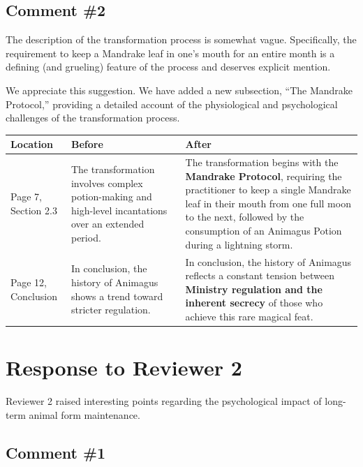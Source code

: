 \documentclass[
  letterpaper,
  DIV=11,
  numbers=noendperiod]{scrartcl}
\begin{document}
\subsection{Comment \#2}\label{comment-2}

\begin{reviewerbox}

The description of the transformation process is somewhat vague. Specifically, the requirement to keep a Mandrake leaf in one's mouth for an entire month is a defining (and grueling) feature of the process and deserves explicit mention.

\end{reviewerbox}

We appreciate this suggestion. We have added a new subsection, ``The Mandrake Protocol,'' providing a detailed account of the physiological and psychological challenges of the transformation process.

\begin{longtable*}{p{0.18\textwidth} p{0.36\textwidth} p{0.36\textwidth}}
\toprule
\textbf{Location} & \textbf{Before} & \textbf{After} \\
\midrule
\endhead
Page 7, Section 2.3 & The transformation involves complex potion-making and high-level
incantations over an extended period. & The transformation begins with the \textbf{Mandrake Protocol}, requiring
the practitioner to keep a single Mandrake leaf in their mouth from one
full moon to the next, followed by the consumption of an Animagus Potion
during a lightning storm. \\
\midrule
Page 12, Conclusion & In conclusion, the history of Animagus shows a trend toward stricter
regulation. & In conclusion, the history of Animagus reflects a constant tension
between \textbf{Ministry regulation and the inherent secrecy} of those
who achieve this rare magical feat. \\
\midrule
\end{longtable*}

\newpage{}

\section{Response to Reviewer 2}\label{response-to-reviewer-2}

Reviewer 2 raised interesting points regarding the psychological impact of long-term animal form maintenance.

\subsection{Comment \#1}\label{comment-1-1}
\end{document}
